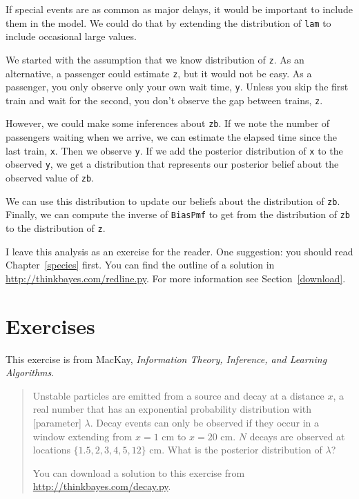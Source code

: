 \documentclass[12pt]{book}
\begin{document}
If special events are as common as major delays, it would
be important to include them in the model.  We could do that by
extending the distribution of {\tt lam} to include occasional
large values.

We started with the assumption that we know
distribution of {\tt z}.
As an alternative, a passenger could estimate {\tt z}, but it would
not be easy.
As a passenger, you only
observe only your own wait time, {\tt y}.  Unless you skip
the first train and wait for the second, you don't
observe the gap between trains, {\tt z}.

However, we could make some inferences about {\tt zb}.  If we note
the number of passengers waiting when we arrive, we can estimate
the elapsed time since the last train, {\tt x}.  Then we observe
{\tt y}.  If we add the posterior distribution of {\tt x} to
the observed {\tt y}, we get a distribution that represents
our posterior belief about the observed value of {\tt zb}.

We can use this distribution to update our beliefs about the
distribution of {\tt zb}.  Finally, we can compute the
inverse of {\tt BiasPmf} to get from the distribution of {\tt zb}
to the distribution of {\tt z}.

I leave this analysis as an exercise for the
reader.  One suggestion: you should read Chapter~\ref{species} first.
You can find the outline of
a solution in \url{http://thinkbayes.com/redline.py}.
  For more information
see Section~\ref{download}.

\section{Exercises}

\begin{exercise}
This exercise is from
MacKay, {\em Information Theory, Inference, and Learning Algorithms}.

\begin{quote}
    Unstable particles are emitted from a source and decay at a
distance $x$, a real number that has an exponential probability
distribution with [parameter] $\lambda$.  Decay events can only be
observed if they occur in a window extending from $x=1$ cm to $x=20$
cm.  $N$ decays are observed at locations $\{ 1.5, 2, 3, 4, 5, 12 \}$
cm.  What is the posterior distribution of $\lambda$?

You can download a solution to this exercise from
\url{http://thinkbayes.com/decay.py}.
\end{quote}

\end{exercise}
\end{document}
